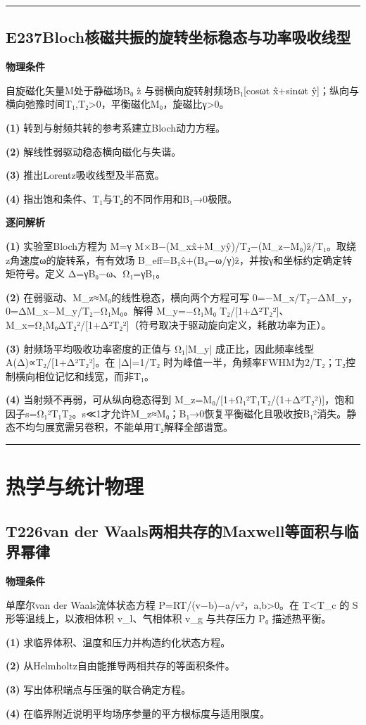 \documentclass[UTF8,a4paper,11pt,oneside,openany]{ctexbook}
\begin{document}
\par\bigskip\hrule\bigskip
\section*{E237\quad Bloch核磁共振的旋转坐标稳态与功率吸收线型}
\textbf{物理条件}\par 自旋磁化矢量M处于静磁场B₀ ẑ 与弱横向旋转射频场B₁[cosωt x̂+sinωt ŷ]；纵向与横向弛豫时间T₁,T₂>0，平衡磁化M₀，旋磁比γ>0。
\par\noindent\textbf{(1)} 转到与射频共转的参考系建立Bloch动力方程。
\par\noindent\textbf{(2)} 解线性弱驱动稳态横向磁化与失谐。
\par\noindent\textbf{(3)} 推出Lorentz吸收线型及半高宽。
\par\noindent\textbf{(4)} 指出饱和条件、T₁与T₂的不同作用和B₁→0极限。

\par\medskip\noindent\textbf{逐问解析}
\par\noindent\textbf{(1)} 实验室Bloch方程为 Ṁ=γ M×B−(M\_xx̂+M\_yŷ)/T₂−(M\_z−M₀)ẑ/T₁。取绕z角速度ω的旋转系，有有效场 B\_eff=B₁x̂+(B₀−ω/γ)ẑ，并按γ和坐标约定确定转矩符号。定义 Δ=γB₀−ω、Ω₁=γB₁。
\par\noindent\textbf{(2)} 在弱驱动、M\_z≈M₀的线性稳态，横向两个方程可写 0=−M\_x/T₂−ΔM\_y，0=ΔM\_x−M\_y/T₂−Ω₁M₀。解得 M\_y=−Ω₁M₀ T₂/[1+Δ²T₂²]、M\_x=Ω₁M₀ΔT₂²/[1+Δ²T₂²]（符号取决于驱动旋向定义，耗散功率为正）。
\par\noindent\textbf{(3)} 射频场平均吸收功率密度的正值与 Ω₁|M\_y| 成正比，因此频率线型 A(Δ)∝T₂/[1+Δ²T₂²]。在 |Δ|=1/T₂ 时为峰值一半，角频率FWHM为2/T₂；T₂控制横向相位记忆和线宽，而非T₁。
\par\noindent\textbf{(4)} 当射频不再弱，可从纵向稳态得到 M\_z=M₀/[1+Ω₁²T₁T₂/(1+Δ²T₂²)]，饱和因子s=Ω₁²T₁T₂。s≪1才允许M\_z≈M₀；B₁→0恢复平衡磁化且吸收按B₁²消失。静态不均匀展宽需另卷积，不能单用T₂解释全部谱宽。

\par\bigskip\hrule\bigskip
\chapter{热学与统计物理}
\section*{T226\quad van der Waals两相共存的Maxwell等面积与临界幂律}
\textbf{物理条件}\par 单摩尔van der Waals流体状态方程 P=RT/(v−b)−a/v²，a,b>0。在 T<T\_c 的 S形等温线上，以液相体积 v\_l、气相体积 v\_g 与共存压力 P₀ 描述热平衡。
\par\noindent\textbf{(1)} 求临界体积、温度和压力并构造约化状态方程。
\par\noindent\textbf{(2)} 从Helmholtz自由能推导两相共存的等面积条件。
\par\noindent\textbf{(3)} 写出体积端点与压强的联合确定方程。
\par\noindent\textbf{(4)} 在临界附近说明平均场序参量的平方根标度与适用限度。
\end{document}
